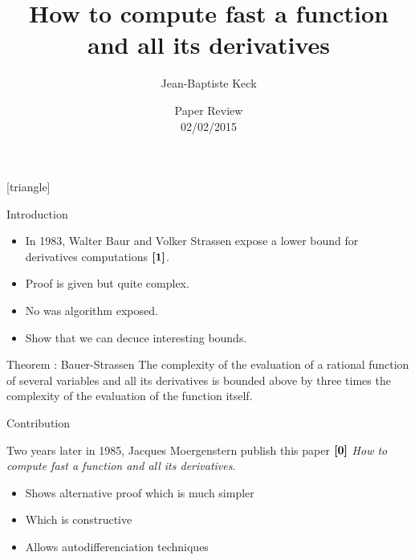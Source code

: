 



[triangle]



\title{\Large How to compute fast a function and all its derivatives}
\author[Keck]{\Large Jean-Baptiste Keck}
\date{\large Paper Review\\ 02/02/2015}

\begin{frame}
    \titlepage
\end{frame}

\begin{frame}{Introduction}

    \begin{itemize} 
        \item In 1983, Walter Baur and Volker Strassen expose a lower bound for derivatives computations $\ccite{1}$.
        \item Proof is given but quite complex.
        \item No was algorithm exposed.
        \item Show that we can decuce interesting bounds.
    \end{itemize}

    \begin{block}{Theorem : Bauer-Strassen}
        The complexity of the evaluation of a rational function of several variables and all its derivatives is bounded above by three times the complexity of the evaluation of the function itself.
    \end{block}
\end{frame}

\begin{frame}{Contribution}
       
    Two years later in 1985, Jacques Moergenstern publish this paper $\ccite{0}$ \textit{How to compute fast a function and all its derivatives}.

    \vskip 0.5cm

    \begin{itemize} 
        \item Shows alternative proof which is much simpler
        \item Which is \alert{constructive} 
        \item Allows autodifferenciation techniques
    \end{itemize}
\end{frame}


